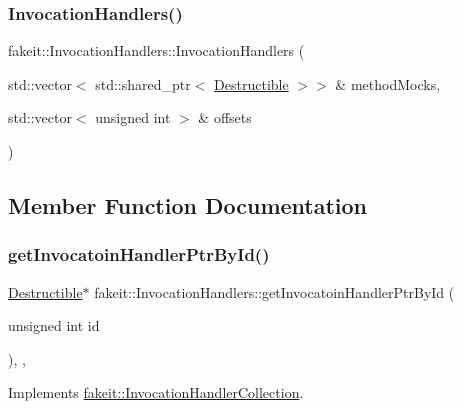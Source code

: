 \subsubsection{\texorpdfstring{InvocationHandlers()}{InvocationHandlers()}\hspace{0.1cm}{\footnotesize\ttfamily [9/9]}}
{\footnotesize\ttfamily fakeit\+::\+Invocation\+Handlers\+::\+Invocation\+Handlers (\begin{DoxyParamCaption}\item[{std\+::vector$<$ std\+::shared\+\_\+ptr$<$ \mbox{\hyperlink{classfakeit_1_1Destructible}{Destructible}} $>$$>$ \&}]{method\+Mocks,  }\item[{std\+::vector$<$ unsigned int $>$ \&}]{offsets }\end{DoxyParamCaption})\hspace{0.3cm}{\ttfamily [inline]}}



\subsection{Member Function Documentation}
\mbox{\label{classfakeit_1_1InvocationHandlers_a47af368f009fc5e3cce950ebbab4c48d}} 
\subsubsection{\texorpdfstring{getInvocatoinHandlerPtrById()}{getInvocatoinHandlerPtrById()}\hspace{0.1cm}{\footnotesize\ttfamily [1/9]}}
{\footnotesize\ttfamily \mbox{\hyperlink{classfakeit_1_1Destructible}{Destructible}}$\ast$ fakeit\+::\+Invocation\+Handlers\+::get\+Invocatoin\+Handler\+Ptr\+By\+Id (\begin{DoxyParamCaption}\item[{unsigned int}]{id }\end{DoxyParamCaption})\hspace{0.3cm}{\ttfamily [inline]}, {\ttfamily [override]}, {\ttfamily [virtual]}}



Implements \mbox{\hyperlink{structfakeit_1_1InvocationHandlerCollection_aa0bb622369d838f8c4daa93a8b992b57}{fakeit\+::\+Invocation\+Handler\+Collection}}.

